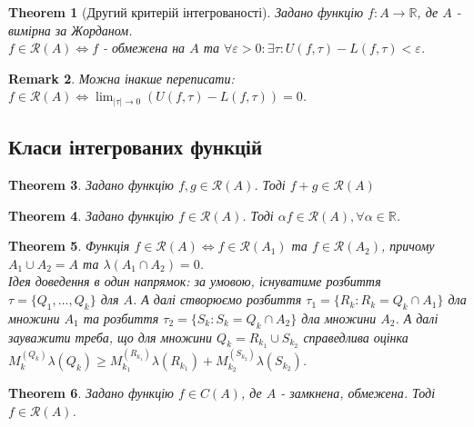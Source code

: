 \documentclass[a4paper, 10pt]{article}
\def\huge{\displaystyle}
\theoremstyle{theoremdd}
\newtheorem{theorem}{Theorem}[subsection]
\theoremstyle{theoremdd}
\theoremstyle{theoremdd}
\theoremstyle{theoremdd}
\theoremstyle{theoremdd}
\theoremstyle{theoremdd}
\newtheorem{remark}[theorem]{Remark}
\theoremstyle{theoremdd}
\theoremstyle{theoremdd}
\begin{document}
\begin{theorem}[Другий критерій інтегрованості]
Задано функцію $f: A \to \mathbb{R}$, де $A$ - вимірна за Жорданом.\\
$f \in \mathcal{R}(A) \iff f$ - обмежена на $A$ та $\forall \varepsilon > 0: \exists \tau: U(f,\tau) - L(f,\tau) < \varepsilon$.
\end{theorem}

\begin{remark}
Можна інакше переписати: $f \in \mathcal{R}(A) \iff \huge\lim_{|\tau| \to 0} (U(f,\tau) - L(f,\tau)) = 0$.
\end{remark}

\subsection{Класи інтегрованих функцій}
\begin{theorem}
Задано функцію $f,g \in \mathcal{R}(A)$. Тоді $f+g \in \mathcal{R}(A)$
\end{theorem}

\begin{theorem}
Задано функцію $f \in \mathcal{R}(A)$. Тоді $\alpha f \in \mathcal{R}(A), \forall \alpha \in \mathbb{R}$.
\end{theorem}

\begin{theorem}
Функція $f \in \mathcal{R}(A) \iff f \in \mathcal{R}(A_1)$ та $f \in \mathcal{R}(A_2)$, причому $A_1 \cup A_2 = A$ та $\lambda(A_1 \cap A_2) = 0$.
\bigskip \\
Ідея доведення в один напрямок: за умовою, існуватиме розбиття $\tau = \{Q_1,\dots,Q_k\}$ для $A$. А далі створюємо розбиття $\tau_1 = \{R_k: R_k = Q_k \cap A_1\}$ дла множини $A_1$ та розбиття $\tau_2 = \{S_k: S_k = Q_k \cap A_2\}$ дла множини $A_2$. А далі зауважити треба, що для множини $Q_k = R_{k_1} \cup S_{k_2}$ справедлива оцінка $M_k^{(Q_k)}\lambda (Q_k) \geq M_{k_1}^{(R_{k_1})} \lambda(R_{k_1}) + M_{k_2}^{(S_{k_2})} \lambda(S_{k_2})$.
\end{theorem}

\begin{theorem}
Задано функцію $f \in C(A)$, де $A$ - замкнена, обмежена. Тоді $f \in \mathcal{R}(A)$.
\end{theorem}
\end{document}
